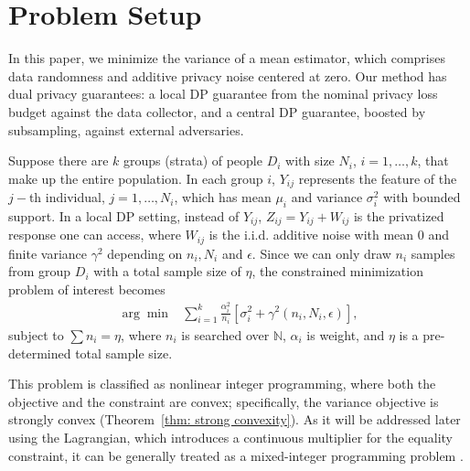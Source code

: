 \documentclass{article}
\theoremstyle{definition}
\begin{document}
\section{Problem Setup} \label{sec: problem setup}

In this paper, we minimize the variance of a mean estimator, which comprises data randomness and additive privacy noise centered at zero. Our method has dual privacy guarantees: a local DP guarantee from the nominal privacy loss budget against the data collector, and a central DP guarantee, boosted by subsampling, against external adversaries. 

Suppose there are $k$ groups (strata) of people $D_i$ with size $N_i$, $i=1,\ldots,k$, that make up the entire population. In each group $i$, $Y_{ij}$ represents the feature of the $j-$th individual, $j=1,\ldots,N_i$, which has mean $\mu_i$ and variance $\sigma_i^2$ with bounded support. In a local DP setting, instead of $Y_{ij}$, $Z_{ij} = Y_{ij} + W_{ij}$ is the privatized response one can access, where $W_{ij}$ is the i.i.d. additive noise with mean $0$ and finite variance $\gamma^2$ depending on $n_i, N_i$ and $\epsilon$. Since we can only draw $n_i$ samples from group $D_i$ with a total sample size of $\eta$, the constrained minimization problem of interest becomes
\begin{align} \label{min: general}
    \arg\min& \sum_{i=1}^k \frac{\alpha_i^2}{n_i} \left[ \sigma_i^2 + \gamma^2 (n_i, N_i, \epsilon) \right],
\end{align}
subject to  $\sum n_i = \eta$, where $n_i$ is searched over $\mathbb{N}$,  $\alpha_i$ is weight, and $\eta$ is a pre-determined total sample size.

This problem is classified as nonlinear integer programming, where both the objective and the constraint are convex; specifically, the variance objective is strongly convex (Theorem~\ref{thm: strong convexity}). As it will be addressed later using the Lagrangian, which introduces a continuous multiplier for the equality constraint, it can be generally treated as a mixed-integer programming problem \citep{lee2011mixed}.
\end{document}
